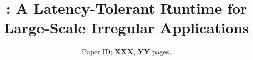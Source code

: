 
\usepackage{microtype}




\title{\Large \Grappa: A Latency-Tolerant Runtime for Large-Scale Irregular Applications}


\author{Paper ID: {\bf XXX}, {\bf YY} pages.}
\date{}


\maketitle
\begin{abstract}

\end{abstract}




















%






